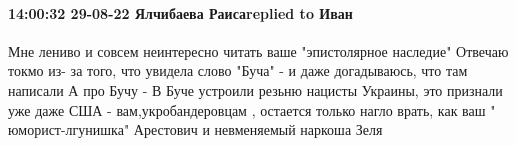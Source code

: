  
 
 
 
 

\paragraph{14:00:32 29-08-22 Ялчибаева Раисаreplied to Иван}

Мне лениво и совсем неинтересно читать ваше "эпистолярное наследие"
Отвечаю токмо из- за того, что увидела слово "Буча" - и даже догадываюсь, что там написали
 А про Бучу - В Буче устроили резьню нацисты Украины, это признали уже даже США - вам,укробандеровцам , остается только нагло врать, как ваш "  юморист-лгунишка" Арестович и   невменяемый  наркоша Зеля
